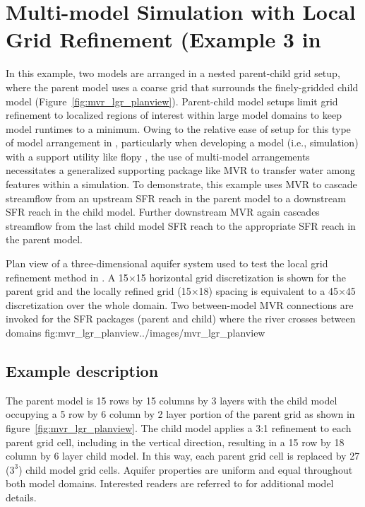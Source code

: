 \section{Multi-model Simulation with Local Grid Refinement (Example 3 in \cite{mehl2013}}


In this example, two models are arranged in a nested parent-child grid setup, where the parent model uses a coarse grid that surrounds the finely-gridded child model (Figure~\ref{fig:mvr_lgr_planview}).  Parent-child model setups limit grid refinement to localized regions of interest within large model domains to keep model runtimes to a minimum.  Owing to the relative ease of setup for this type of model arrangement in \mf, particularly when developing a model (i.e., simulation) with a support utility like flopy \citep{bakker2016}, the use of multi-model arrangements necessitates a generalized supporting package like MVR to transfer water among features within a simulation.  To demonstrate, this example uses MVR to cascade streamflow from an upstream SFR reach in the parent model to a downstream SFR reach in the child model.  Further downstream MVR again cascades streamflow from the last child model SFR reach to the appropriate SFR reach in the parent model.  

\begin{StandardFigure}
	{Plan view of a three-dimensional aquifer system used to test the local grid refinement method in \mf. A 15$\times$15 horizontal grid discretization is shown for the parent grid and the locally refined grid (15$\times$18) spacing is equivalent to a 45$\times$45 discretization over the whole domain.  Two between-model MVR connections are invoked for the SFR packages (parent and child) where the river crosses between domains}
	{fig:mvr_lgr_planview}{../images/mvr_lgr_planview}
\end{StandardFigure}

\subsection{Example description}

The parent model is 15 rows by 15 columns by 3 layers with the child model occupying a 5 row by 6 column by 2 layer portion of the parent grid as shown in figure~\ref{fig:mvr_lgr_planview}.  The child model applies a 3:1 refinement to each parent grid cell, including in the vertical direction, resulting in a 15 row by 18 column by 6 layer child model.  In this way, each parent grid cell is replaced by 27 ($3^3$) child model grid cells.  Aquifer properties are uniform and equal throughout both model domains.  Interested readers are referred to \cite{mehl2013} for additional model details.  

